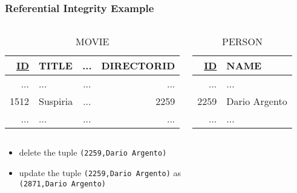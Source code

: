 \documentclass[dvipsnames]{beamer}
\theoremstyle{plain}
\begin{document}
\begin{frame}
  \frametitle{Referential Integrity Example}

  \begin{example}
    \begin{columns}
      \begin{tiny}
      \begin{table}
        \caption{MOVIE}
        \begin{tabular}{|r|l|c|r|}\hline
\underline{ID} & TITLE & ... & DIRECTORID\\\hline\hline
 ... & ...             & ... &        ...\\\hline
1512 & Suspiria        & ... &       2259\\\hline
 ... & ...             & ... &        ...\\\hline
        \end{tabular}
      \end{table}
      \end{tiny}

      \begin{tiny}
      \begin{table}
        \caption{PERSON}
        \begin{tabular}{|r|l|}\hline
\underline{ID} & NAME\\\hline\hline
 ... & ...           \\\hline
2259 & Dario Argento \\\hline
 ... & ...           \\\hline
        \end{tabular}
      \end{table}
      \end{tiny}
    \end{columns}

    \pause
    \begin{itemize}
      \item delete the tuple \texttt{(2259,Dario Argento)}
      \item update the tuple \texttt{(2259,Dario Argento)} as\\
        \texttt{(2871,Dario Argento)}
    \end{itemize}
  \end{example}
\end{frame}
\end{document}
